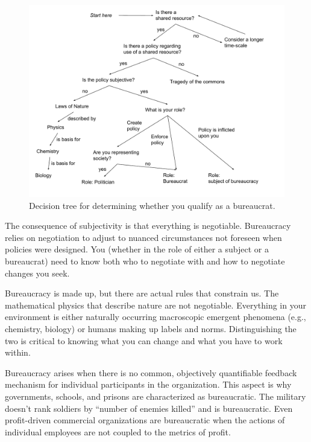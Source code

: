 \begin{figure}
    \centering
    \includegraphics[width=1.05\textwidth]{images/am_I_a_bureaucrat.pdf}
    \caption{Decision tree for determining whether you qualify as a bureaucrat.}
    \label{fig:am-I-a-bureaucrat}
\end{figure}

The consequence of subjectivity is that everything is negotiable. Bureaucracy relies on negotiation to adjust to nuanced circumstances not foreseen when policies were designed.  You (whether in the role of either a subject or a bureaucrat) need to know both who to negotiate with and how to negotiate changes you seek. 

Bureaucracy is made up, but there are actual rules that constrain us. The mathematical physics that describe nature are not negotiable. Everything in your environment is either naturally occurring macroscopic emergent phenomena (e.g., chemistry, biology) or humans making up labels and norms. Distinguishing the two is critical to knowing what you can change and what you have to work within. 

Bureaucracy arises when there is no common, objectively quantifiable feedback mechanism for individual participants in the organization. This aspect is why governments, schools, and prisons are characterized as bureaucratic. 
The military doesn't rank soldiers by ``number of enemies killed'' and is bureaucratic. 
Even profit-driven commercial organizations are bureaucratic when the actions of individual employees are not coupled to the metrics of profit. %

